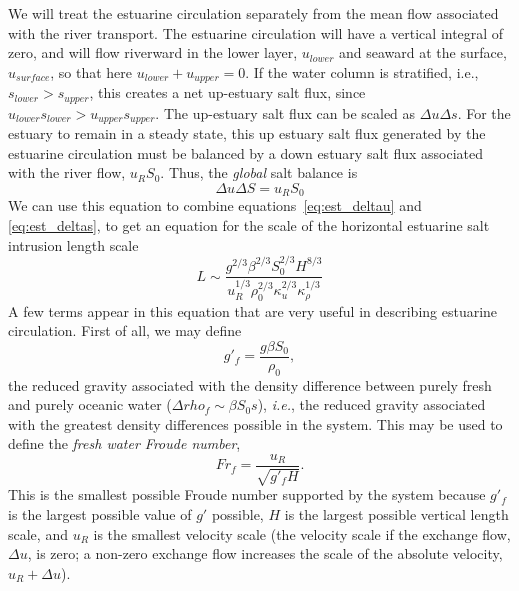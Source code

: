 \documentclass[11pt]{report}
\numberwithin{equation}{section}
\begin{document}
We will treat the estuarine circulation separately from the mean flow associated with the river transport.  The estuarine circulation will have a vertical integral of zero, and will flow riverward in the lower layer, $u_{lower}$ and seaward at the surface, $u_{surface}$, so that here $u_{lower} + u_{upper} = 0$.  If the water column is stratified, i.e., $s_{lower} > s_{upper}$, this creates a net up-estuary salt flux, since $u_{lower} s_{lower} > u_{upper} s_{upper}$.  The up-estuary salt flux can be scaled as $\Delta u \Delta s$.  For the estuary to remain in a steady state, this up estuary salt flux generated by the estuarine circulation must be balanced by a down estuary salt flux associated with the river flow, $u_R S_0$.  Thus, the \emph{global} salt balance is
\begin{equation}
    \Delta u \Delta S = u_R S_0
\end{equation}
We can use this equation to combine equations~\ref{eq:est_deltau} and \ref{eq:est_deltas}, to get an equation for the scale of the horizontal estuarine salt intrusion length scale
\begin{equation}
    L \sim \frac{g^{2/3} \beta^{2/3} S_0^{2/3} H^{8/3}}{u_R^{1/3} \rho_0^{2/3} \kappa_u^{2/3} \kappa_\rho^{1/3} }
\end{equation}
A few terms appear in this equation that are very useful in describing estuarine circulation.  First of all, we may define
\begin{equation}
    g'_f = \frac{g \beta S_0}{\rho_0},
\end{equation}
the reduced gravity associated with the density difference between purely fresh and purely oceanic water ($\Delta rho_f \sim \beta S_0s$), \emph{i.e.}, the reduced gravity associated with the greatest density differences possible in the system.  This may be used to define the \emph{fresh water Froude number},
\begin{equation}
    Fr_f = \frac{u_R}{\sqrt{g'_f H}}.
\end{equation}
This is the smallest possible Froude number supported by the system because $g'_f$ is the largest possible value of $g'$ possible, $H$ is the largest possible vertical length scale, and $u_R$ is the smallest velocity scale (the velocity scale if the exchange flow, $\Delta u$, is zero; a non-zero exchange flow increases the scale of the absolute velocity, $u_R + \Delta u$).  
\end{document}
